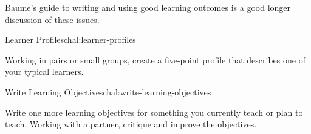 \noindent
Baume's guide to writing and using good learning outcomes
\cite{bib:baume-outcomes} is a good longer discussion of these issues.

\begin{challenge}{Learner Profiles}{chal:learner-profiles}

Working in pairs or small groups, create a five-point profile that
describes one of your typical learners.

\end{challenge}

\begin{challenge}{Write Learning Objectives}{chal:write-learning-objectives}

Write one more learning objectives for something you currently teach
or plan to teach.  Working with a partner, critique and improve the
objectives.

\end{challenge}
